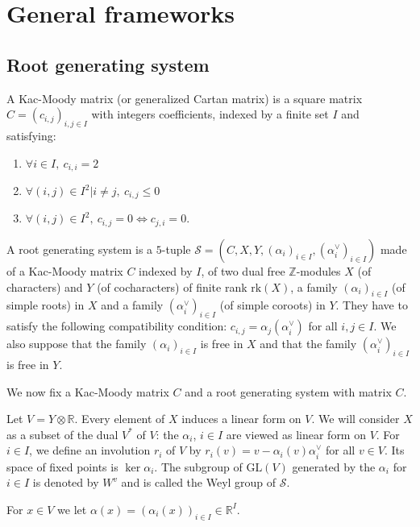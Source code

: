 \documentclass[12pt]{article}
\theoremstyle{plain}
\theoremstyle{definition}
\newcommand{\R}{\mathbb{R}}
\newcommand{\Z}{\mathbb{Z}}
\begin{document}
\section{General frameworks}\label{sect general frameworks}
\subsection{Root generating system}
A Kac-Moody matrix (or generalized Cartan matrix) is a square matrix $C=(c_{i,j})_{i,j\in I}$ with integers coefficients, indexed by  a finite set $I$ and satisfying: 
\begin{enumerate}
\item $\forall i\in I,\ c_{i,i}=2$

\item $\forall (i,j)\in I^2|i \neq j,\ c_{i,j}\leq 0$

\item $\forall (i,j)\in I^2,\ c_{i,j}=0 \Leftrightarrow c_{j,i}=0$.
\end{enumerate}

A root generating system is a $5$-tuple $\mathcal{S}=(C,X,Y,(\alpha_i)_{i\in I},(\alpha_i^\vee)_{i\in I})$ made of a Kac-Moody matrix $C$ indexed by $I$, of two dual free $\Z$-modules $X$ (of characters) and $Y$ (of cocharacters) of finite rank $\mathrm{rk}(X)$, a family $(\alpha_i)_{i\in I}$ (of simple roots) in $X$ and a family $(\alpha_i^\vee)_{i\in I}$ (of simple coroots) in $Y$. They have to satisfy the following compatibility condition: $c_{i,j}=\alpha_j(\alpha_i^\vee)$ for all $i,j\in I$. We also suppose that the family $(\alpha_i)_{i\in I}$ is free in $X$ and that the family $(\alpha_i^\vee)_{i\in I}$ is free in $Y$.



 We now fix a Kac-Moody matrix $C$ and a root generating system with matrix $C$.



Let $V=Y\otimes \R$. Every element of $X$ induces a linear form on $V$. We will consider $X$ as a subset of the dual $V^*$ of $V$: the $\alpha_i$, $i\in I$ are viewed as linear form on $V$. For $i\in I$, we define an involution $r_i$ of $V$ by $r_i(v)=v-\alpha_i(v)\alpha_i^\vee$ for all $v\in V$. Its space of fixed points is $\ker \alpha_i$. The subgroup of $\mathrm{GL}(V)$ generated by the $\alpha_i$ for $i\in I$ is denoted by $W^v$ and is called the Weyl group of $\mathcal S$.


For $x\in V$ we let $\alpha(x)=(\alpha_i(x))_{i\in I}\in \R^I$.
\end{document}
